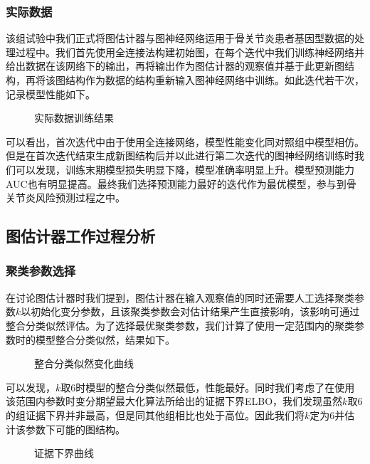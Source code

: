 \subsubsection{实际数据}

该组试验中我们正式将图估计器与图神经网络运用于骨关节炎患者基因型数据的处理过程中。我们首先使用全连接法构建初始图，在每个迭代中我们训练神经网络并给出数据在该网络下的输出，再将输出作为图估计器的观察值并基于此更新图结构，再将该图结构作为数据的结构重新输入图神经网络中训练。如此迭代若干次，记录模型性能如下。
\begin{figure}[htbp]
\centering
\subfigure[训练损失曲线]{

}
\subfigure[训练准确率曲线]{

}
\subfigure[测试AUC曲线]{

}
\caption{实际数据训练结果}
\end{figure}
可以看出，首次迭代中由于使用全连接网络，模型性能变化同对照组中模型相仿。但是在首次迭代结束生成新图结构后并以此进行第二次迭代的图神经网络训练时我们可以发现，训练末期模型损失明显下降，模型准确率明显上升。模型预测能力AUC也有明显提高。最终我们选择预测能力最好的迭代作为最优模型，参与到骨关节炎风险预测过程之中。

\subsection{图估计器工作过程分析}

\subsubsection{聚类参数选择}

在讨论图估计器时我们提到，图估计器在输入观察值的同时还需要人工选择聚类参数$k$以初始化变分参数，且该聚类参数会对估计结果产生直接影响，该影响可通过整合分类似然评估。为了选择最优聚类参数，我们计算了使用一定范围内的聚类参数时的模型整合分类似然，结果如下。
\begin{figure}[!ht]
\centering

\caption{整合分类似然变化曲线} \label{fig_ch2}
\end{figure}

可以发现，$k$取6时模型的整合分类似然最低，性能最好。同时我们考虑了在使用该范围内参数时变分期望最大化算法所给出的证据下界ELBO，我们发现虽然$k$取6的组证据下界并非最高，但是同其他组相比也处于高位。因此我们将$k$定为6并估计该参数下可能的图结构。

\begin{figure}[!ht]
\centering

\caption{证据下界曲线} \label{fig_ch2}
\end{figure}


